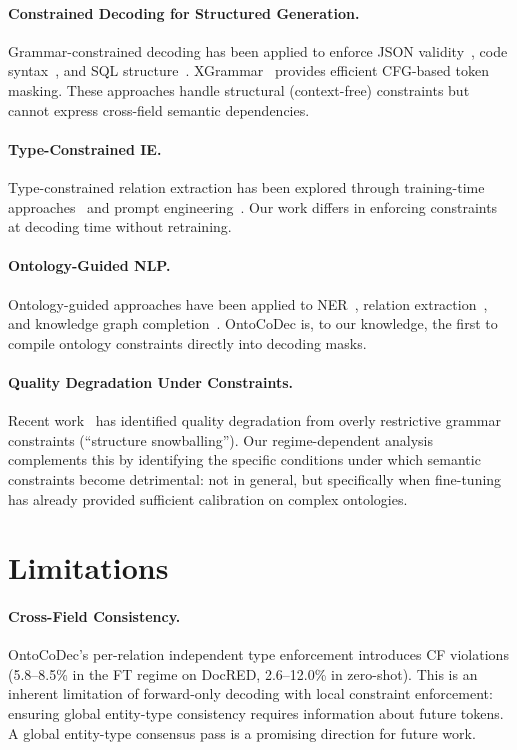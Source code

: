 \documentclass[11pt,a4paper]{article}
\newcommand{\system}{OntoCoDec}
\begin{document}
\paragraph{Constrained Decoding for Structured Generation.}
Grammar-constrained decoding has been applied to enforce JSON validity~\cite{willard2023efficient}, code syntax~\cite{scholak2021picard}, and SQL structure~\cite{poesia2022synchromesh}. XGrammar~\cite{dong2024xgrammar} provides efficient CFG-based token masking. These approaches handle structural (context-free) constraints but cannot express cross-field semantic dependencies.

\paragraph{Type-Constrained IE.}
Type-constrained relation extraction has been explored through training-time approaches~\cite{zhang2017position,han2018fewrel} and prompt engineering~\cite{wadhwa2023revisiting,li2023revisiting}. Our work differs in enforcing constraints at decoding time without retraining.

\paragraph{Ontology-Guided NLP.}
Ontology-guided approaches have been applied to NER~\cite{li2020dice}, relation extraction~\cite{zhang2019ernie}, and knowledge graph completion~\cite{bordes2013translating}. \system{} is, to our knowledge, the first to compile ontology constraints directly into decoding masks.

\paragraph{Quality Degradation Under Constraints.}
Recent work~\cite{park2024grammar} has identified quality degradation from overly restrictive grammar constraints (``structure snowballing''). Our regime-dependent analysis complements this by identifying the specific conditions under which semantic constraints become detrimental: not in general, but specifically when fine-tuning has already provided sufficient calibration on complex ontologies.

\section{Limitations}

\paragraph{Cross-Field Consistency.}
\system{}'s per-relation independent type enforcement introduces CF violations (5.8--8.5\% in the FT regime on DocRED, 2.6--12.0\% in zero-shot). This is an inherent limitation of forward-only decoding with local constraint enforcement: ensuring global entity-type consistency requires information about future tokens. A global entity-type consensus pass is a promising direction for future work.
\end{document}
